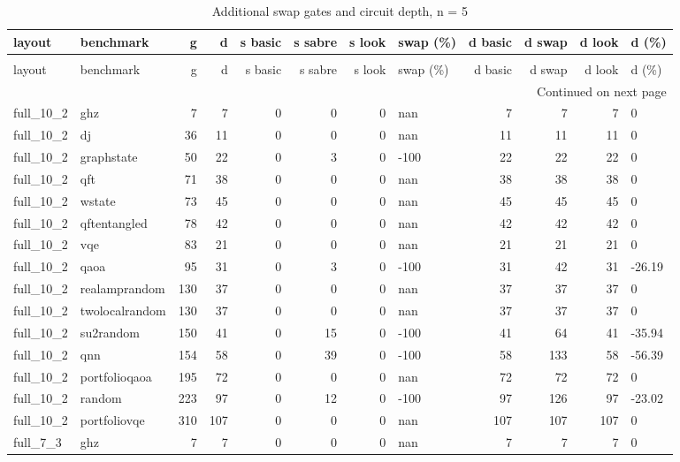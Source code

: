\begin{longtable}{llrrrrrlrrrl}
\caption{Additional swap gates and circuit depth, n = 5} \label{benchmark-table-5} \\
\toprule
layout & benchmark & g & d & s basic & s sabre & s look & swap (\%) & d basic & d swap & d look & d (\%) \\
\midrule
\endfirsthead
\caption[]{Additional swap gates and circuit depth, n = 5} \\
\toprule
layout & benchmark & g & d & s basic & s sabre & s look & swap (\%) & d basic & d swap & d look & d (\%) \\
\midrule
\endhead
\midrule
\multicolumn{12}{r}{Continued on next page} \\
\midrule
\endfoot
\bottomrule
\endlastfoot
full\_10\_2 & ghz & 7 & 7 & 0 & 0 & 0 & nan & 7 & 7 & 7 & 0 \\
full\_10\_2 & dj & 36 & 11 & 0 & 0 & 0 & nan & 11 & 11 & 11 & 0 \\
full\_10\_2 & graphstate & 50 & 22 & 0 & 3 & 0 & -100 & 22 & 22 & 22 & 0 \\
full\_10\_2 & qft & 71 & 38 & 0 & 0 & 0 & nan & 38 & 38 & 38 & 0 \\
full\_10\_2 & wstate & 73 & 45 & 0 & 0 & 0 & nan & 45 & 45 & 45 & 0 \\
full\_10\_2 & qftentangled & 78 & 42 & 0 & 0 & 0 & nan & 42 & 42 & 42 & 0 \\
full\_10\_2 & vqe & 83 & 21 & 0 & 0 & 0 & nan & 21 & 21 & 21 & 0 \\
full\_10\_2 & qaoa & 95 & 31 & 0 & 3 & 0 & -100 & 31 & 42 & 31 & -26.19 \\
full\_10\_2 & realamprandom & 130 & 37 & 0 & 0 & 0 & nan & 37 & 37 & 37 & 0 \\
full\_10\_2 & twolocalrandom & 130 & 37 & 0 & 0 & 0 & nan & 37 & 37 & 37 & 0 \\
full\_10\_2 & su2random & 150 & 41 & 0 & 15 & 0 & -100 & 41 & 64 & 41 & -35.94 \\
full\_10\_2 & qnn & 154 & 58 & 0 & 39 & 0 & -100 & 58 & 133 & 58 & -56.39 \\
full\_10\_2 & portfolioqaoa & 195 & 72 & 0 & 0 & 0 & nan & 72 & 72 & 72 & 0 \\
full\_10\_2 & random & 223 & 97 & 0 & 12 & 0 & -100 & 97 & 126 & 97 & -23.02 \\
full\_10\_2 & portfoliovqe & 310 & 107 & 0 & 0 & 0 & nan & 107 & 107 & 107 & 0 \\
full\_7\_3 & ghz & 7 & 7 & 0 & 0 & 0 & nan & 7 & 7 & 7 & 0 \\

\end{longtable}
